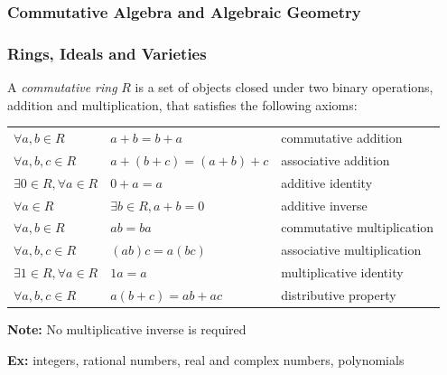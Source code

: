 \documentclass{beamer}
\begin{document}
\begin{frame}
\frametitle{Commutative Algebra and Algebraic Geometry}

\begin{center}
\end{center}

\end{frame}

\begin{frame}
\frametitle{Rings, Ideals and Varieties}
\begin{definition}
A {\it commutative ring} $R$ is a set of objects closed under two binary operations, addition and multiplication,
that satisfies the following axioms:
\vskip 12pt
\begin{tabular}{lll}
$\forall a,b \in R $ & $a+b = b+a$ & commutative addition\\
$\forall a,b,c \in R $ & $ a+(b+c) = (a+b)+c$ & associative addition\\
$\exists 0 \in R, \forall a\in R $ & $ 0 + a = a$ &additive identity\\
$\forall a \in R $ & $\exists b \in R, a + b = 0$ &additive inverse\\
$\forall a,b \in R $ & $ ab = ba$ & commutative multiplication\\
$\forall a,b,c \in R $ & $ (ab)c = a(bc)$ & associative multiplication\\
$\exists 1 \in R, \forall a\in R $ & $ 1a = a$ & multiplicative identity\\
$\forall a,b,c \in R $ & $ a(b+c) = ab+ac$ & distributive property\\
\end{tabular}
\end{definition}
{\bf Note:} No multiplicative inverse is required

{\bf Ex:} integers, rational numbers, real and complex numbers, polynomials
\end{frame}
\end{document}
